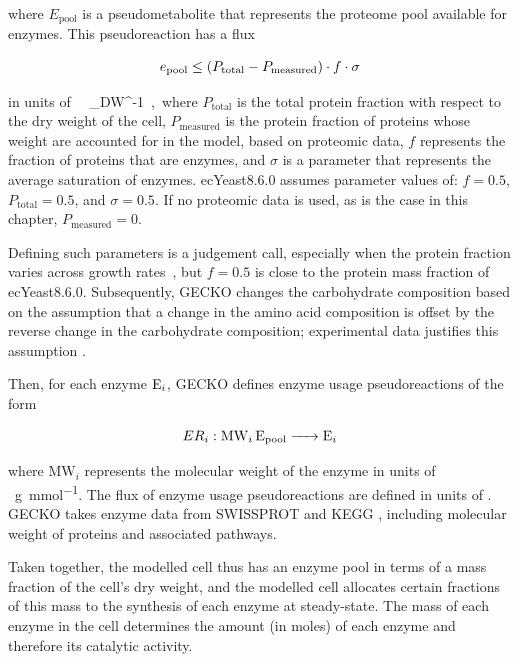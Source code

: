 where $E_{\mathrm{pool}}$ is a pseudometabolite that represents the proteome pool available for enzymes.
This pseudoreaction has a flux

\begin{equation}
  e_{\mathrm{pool}} \leq (P_{\mathrm{total}} - P_{\mathrm{measured}}) \cdot f \cdot \sigma
  \label{eq:model-gecko-enzyme-pool-flux}
\end{equation}

in units of \SI{}{\gram~\gram_{DW}^{-1}}, where
$P_{\mathrm{total}}$ is the total protein fraction with respect to the dry weight of the cell,
$P_{\mathrm{measured}}$ is the protein fraction of proteins whose weight are accounted for in the model, based on proteomic data,
$f$ represents the fraction of proteins that are enzymes, and
$\sigma$ is a parameter that represents the average saturation of enzymes.
ecYeast8.6.0 assumes parameter values of: $f = 0.5$, $P_{\mathrm{total}} = 0.5$, and $\sigma = 0.5$.
If no proteomic data is used, as is the case in this chapter, $P_{\mathrm{measured}} = 0$.

Defining such parameters is a judgement call, especially when the protein fraction varies across growth rates~\parencite{elsemmanWholecellModelingYeast2022}, but $f = 0.5$ is close to the protein mass fraction of ecYeast8.6.0.
Subsequently, GECKO changes the carbohydrate composition based on the assumption that a change in the amino acid composition is offset by the reverse change in the carbohydrate composition;
experimental data justifies this assumption \parencite{nissenFluxDistributionsAnaerobic1997}.

Then, for each enzyme $\ce{E_{i}}$, GECKO defines enzyme usage pseudoreactions of the form

\begin{equation}
  ER_{i}: \ce{ MW_{i} E_{\mathrm{pool}} -> E_{i} }
  \label{eq:model-gecko-enzyme-usage}
\end{equation}

where $\mathrm{MW}_{i}$ represents the molecular weight of the enzyme in units of \SI{}{\gram~\milli\mole^{-1}}.
The flux of enzyme usage pseudoreactions are defined in units of \SI{}{\mmolgdw}.
GECKO takes enzyme data from SWISSPROT \parencite{theuniprotconsortiumUniProtUniversalProtein2023} and KEGG \parencite{kanehisaKEGGTaxonomybasedAnalysis2023}, including molecular weight of proteins and associated pathways.


Taken together, the modelled cell thus has an enzyme pool in terms of a mass fraction of the cell's dry weight, and the modelled cell allocates certain fractions of this mass to the synthesis of each enzyme at steady-state.
The mass of each enzyme in the cell determines the amount (in moles) of each enzyme and therefore its catalytic activity.


